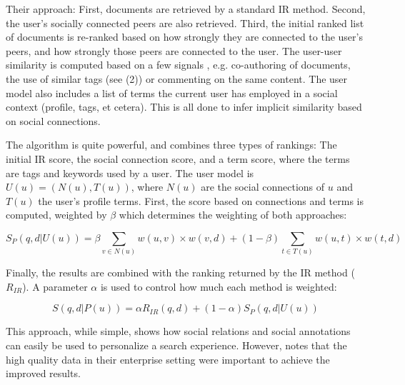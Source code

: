 Their approach: First, documents are retrieved by a standard IR method. Second, the user's socially connected peers
are also retrieved. Third, the initial ranked list of documents is re-ranked based on how strongly they are connected 
to the user's peers, and how strongly those peers are connected to the user. The user-user similarity is
computed based on a few signals \cite[p2]{Carmel2009}, e.g. co-authoring of documents, the use of similar tags
(see (2)) or commenting on the same content. 
The user model also includes a list of terms the current user has employed in a social context (profile, tags, et cetera).
This is all done to infer implicit similarity based on social connections.

The algorithm is quite powerful, and combines three types of rankings: 
The initial IR score, the social connection score, and a term score, where the terms are tags and keywords used by a user.
The user model is $U(u) = (N(u), T(u))$, 
where $N(u)$ are the social connections of $u$ and $T(u)$ the user's profile terms.
First, the score based on connections and terms is computed, weighted by $\beta$ which determines the weighting of both approaches:

\begin{equation*}
  S_P(q,d|U(u)) = \beta \sum_{v \in N(u)} w(u,v) \times w(v,d) + (1-\beta) \sum_{t \in T(u)} w(u,t) \times w(t,d)
\end{equation*}

Finally, the results are combined with the ranking returned by the IR method ($R_{IR}$). 
A parameter $\alpha$ is used to control how much each method is weighted:

\begin{equation*}
  S(q,d|P(u)) = \alpha R_{IR}(q,d) + (1-\alpha) S_P(q,d|U(u)) 
\end{equation*}

This approach, while simple, shows how social relations and social annotations can easily be used to personalize a search experience.
However, \citet[p10]{Carmel2009} notes that the high quality data in their enterprise setting were important
to achieve the improved results. 



